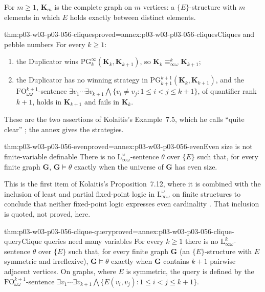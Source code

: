 For \(m\geq1\), \(\mathbf K_m\) is the complete graph on \(m\) vertices: a
\(\{E\}\)-structure with \(m\) elements in which \(E\) holds exactly between
distinct elements.

\begin{hbtheorem}{thm:p03-w03-p03-056-cliques}{proved=annex:p03-w03-p03-056-cliques}{Cliques and pebble numbers}
For every \(k\geq1\):
\begin{enumerate}
\item the Duplicator wins \(\mathrm{PG}^\infty_k(\mathbf K_k,\mathbf K_{k+1})\),
      so \(\mathbf K_k\equiv^k_{\infty\omega}\mathbf K_{k+1}\);
\item the Duplicator has no winning strategy in
      \(\mathrm{PG}^{k+1}_{k+1}(\mathbf K_k,\mathbf K_{k+1})\), and the
      \(\mathrm{FO}^{k+1}_{\omega\omega}\)-sentence
      \(\exists v_1\cdots\exists v_{k+1}\bigwedge\{v_i\neq v_j:1\leq i<j\leq k+1\}\),
      of quantifier rank \(k+1\), holds in \(\mathbf K_{k+1}\) and fails in
      \(\mathbf K_k\).
\end{enumerate}
\end{hbtheorem}

These are the two assertions of Kolaitis's Example~7.5, which he calls
``quite clear'' \cite[Ex.~7.5, p.~56]{Kolaitis2003ExpressivePowerNotes};
the annex gives the strategies.

\begin{hbcorollary}{thm:p03-w03-p03-056-even}{proved=annex:p03-w03-p03-056-even}{Even size is not finite-variable definable}
There is no \(\mathrm{L}^\omega_{\infty\omega}\)-sentence \(\theta\) over
\(\{E\}\) such that, for every finite graph \(\mathbf G\),
\(\mathbf G\models\theta\) exactly when the universe of \(\mathbf G\) has
even size.
\end{hbcorollary}

This is the first item of Kolaitis's Proposition~7.12, where it is combined
with the inclusion of least and partial fixed-point logic in
\(\mathrm{L}^\omega_{\infty\omega}\) on finite structures to conclude that
neither fixed-point logic expresses even cardinality
\cite[Thm.~7.2, p.~54; Prop.~7.12, p.~60]{Kolaitis2003ExpressivePowerNotes}.
That inclusion is quoted, not proved, here.

\begin{hbcorollary}{thm:p03-w03-p03-056-clique-query}{proved=annex:p03-w03-p03-056-clique-query}{Clique queries need many variables}
For every \(k\geq1\) there is no \(\mathrm{L}^k_{\infty\omega}\)-sentence
\(\theta\) over \(\{E\}\) such that, for every finite graph \(\mathbf G\)
(an \(\{E\}\)-structure with \(E\) symmetric and irreflexive),
\(\mathbf G\models\theta\) exactly when \(\mathbf G\) contains \(k+1\)
pairwise adjacent vertices. On graphs, where \(E\) is symmetric, the query is defined by the
\(\mathrm{FO}^{k+1}_{\omega\omega}\)-sentence
\(\exists v_1\cdots\exists v_{k+1}\bigwedge\{E(v_i,v_j):1\leq i<j\leq k+1\}\).
\end{hbcorollary}

